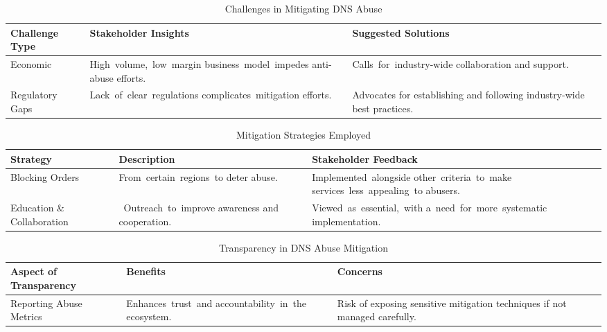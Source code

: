 {

\begin{table}[H]
\centering
\footnotesize 
\begin{tabular}{|l|p{4cm}|p{4cm}|}
\hline
\textbf{Challenge Type} & \textbf{Stakeholder Insights} & \textbf{Suggested Solutions} \\
\hline
Economic & \mbox {High volume, low margin} \mbox {business model impedes} anti-abuse efforts. & \mbox {Calls for industry-wide} collaboration and support. \\
\hline
Regulatory Gaps & \mbox {Lack of clear regulations} \mbox {complicates mitigation} efforts. & Advocates for establishing and following industry-wide best practices. \\
\hline
\end{tabular}
\caption{Challenges in Mitigating DNS Abuse}
\label{table:challenges_in_mitigation}
\end{table}


}

{

\begin{table}[H]
\centering
\footnotesize 
\begin{tabular}{|l|p{4cm}|p{4cm}|}
\hline
\textbf{Strategy} & \textbf{Description} & \textbf{Stakeholder Feedback} \\
\hline
Blocking Orders & \mbox {From certain regions to} deter abuse. & \mbox {Implemented alongside} \mbox {other criteria to make} \mbox {services less appealing to} abusers. \\
\hline
Education \& Collaboration & \mbox { Outreach to improve} awareness and cooperation. & \mbox {Viewed as essential, with} \mbox {a need for more systematic} implementation. \\
\hline
\end{tabular}
\caption{Mitigation Strategies Employed}
\label{table:mitigation_strategies}
\end{table}

}

{
\begin{table}[H]
\centering
\footnotesize 
\begin{tabular}{|l|p{4cm}|p{4cm}|}
\hline
\textbf{Aspect of Transparency} & \textbf{Benefits} & \textbf{Concerns} \\
\hline
Reporting Abuse Metrics & \mbox {Enhances trust and} \mbox {accountability in the} ecosystem. & Risk of exposing sensitive mitigation techniques if not managed carefully. \\
\hline
\end{tabular}
\caption{Transparency in DNS Abuse Mitigation}
\label{table:transparency_in_mitigation}
\end{table}


}

